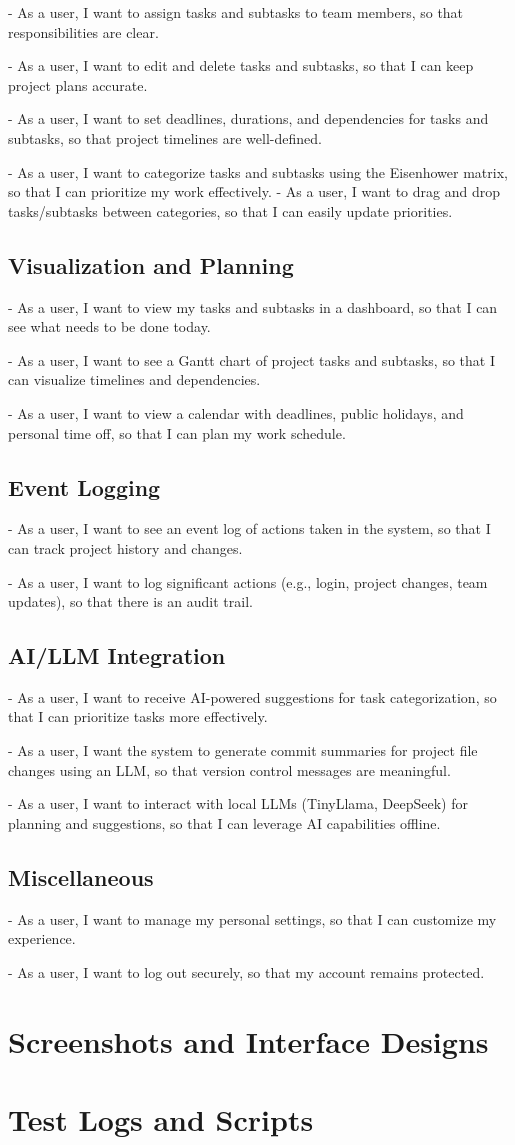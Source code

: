 \documentclass{report}
\begin{document}
- As a user, I want to assign tasks and subtasks to team members, so that responsibilities are clear.

- As a user, I want to edit and delete tasks and subtasks, so that I can keep project plans accurate.

- As a user, I want to set deadlines, durations, and dependencies for tasks and subtasks, so that project timelines are well-defined.

- As a user, I want to categorize tasks and subtasks using the Eisenhower matrix, so that I can prioritize my work effectively.
- As a user, I want to drag and drop tasks/subtasks between categories, so that I can easily update priorities.

\section{Visualization and Planning}
- As a user, I want to view my tasks and subtasks in a dashboard, so that I can see what needs to be done today.

- As a user, I want to see a Gantt chart of project tasks and subtasks, so that I can visualize timelines and dependencies.

- As a user, I want to view a calendar with deadlines, public holidays, and personal time off, so that I can plan my work schedule.

\section{Event Logging}
- As a user, I want to see an event log of actions taken in the system, so that I can track project history and changes.

- As a user, I want to log significant actions (e.g., login, project changes, team updates), so that there is an audit trail.

\section{AI/LLM Integration}
- As a user, I want to receive AI-powered suggestions for task categorization, so that I can prioritize tasks more effectively.

- As a user, I want the system to generate commit summaries for project file changes using an LLM, so that version control messages are meaningful.

- As a user, I want to interact with local LLMs (TinyLlama, DeepSeek) for planning and suggestions, so that I can leverage AI capabilities offline.

\section{Miscellaneous}
- As a user, I want to manage my personal settings, so that I can customize my experience.

- As a user, I want to log out securely, so that my account remains protected.

\chapter{Screenshots and Interface Designs}
\chapter{Test Logs and Scripts}
\end{document}
